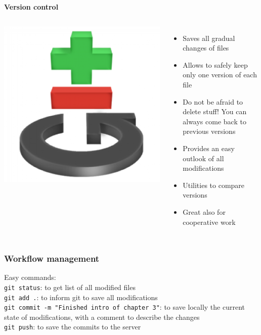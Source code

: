 \documentclass[9pt,xcolor=pdftex,dvipsnames,table]{beamer}
\begin{document}
\begin{frame}{\textbf{Version control}}
\begin{columns}
\centering
\includegraphics[width=1\textwidth]{images/git-logo.png}
\begin{itemize}
\item Saves all gradual changes of files
\item Allows to safely keep only one version of each file 
\item Do not be afraid to delete stuff! You can always come back to previous versions
\item Provides an easy outlook of all modifications
\item Utilities to compare versions
\item Great also for cooperative work
\end{itemize}
\end{columns}
\end{frame}


\begin{frame}[fragile]
\frametitle{\textbf{Workflow management}}
Easy commands: \\
\verb=git status=: to get list of all modified files \\
\verb=git add .=: to inform git to save all modifications \\
\verb=git commit -m "Finished intro of chapter 3"=: to save locally the
current state of modifications, with a comment to describe the changes \\
\verb=git push=: to save the commits to the server
\end{frame}
\end{document}
